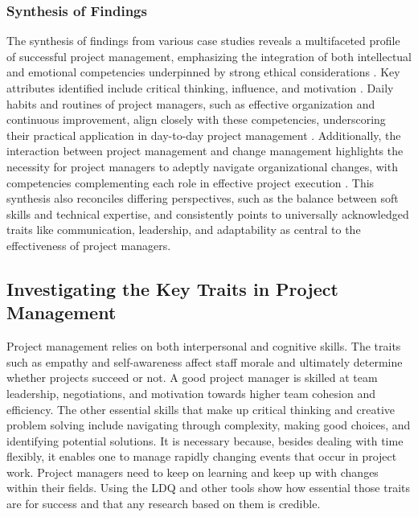 \documentclass{article}
\begin{document}
\subsubsection{Synthesis of Findings}

The synthesis of findings from various case studies reveals a multifaceted profile of successful project management, emphasizing the integration of both intellectual and emotional competencies underpinned by strong ethical considerations \cite{bredillet2015good}. Key attributes identified include critical thinking, influence, and motivation \cite{muller2010leadership}. Daily habits and routines of project managers, such as effective organization and continuous improvement, align closely with these competencies, underscoring their practical application in day-to-day project management \cite{sigurdhssonpatterns}. Additionally, the interaction between project management and change management highlights the necessity for project managers to adeptly navigate organizational changes, with competencies complementing each role in effective project execution \cite{pollack2016project}. This synthesis also reconciles differing perspectives, such as the balance between soft skills and technical expertise, and consistently points to universally acknowledged traits like communication, leadership, and adaptability as central to the effectiveness of project managers.


\subsection{Investigating the Key Traits in Project Management}
Project management relies on both interpersonal and cognitive skills. The traits such as empathy and self-awareness affect staff morale and ultimately determine whether projects succeed or not. A good project manager is skilled at team leadership, negotiations, and motivation towards higher team cohesion and efficiency. The other essential skills that make up critical thinking and creative problem solving include navigating through complexity, making good choices, and identifying potential solutions. It is necessary because, besides dealing with time flexibly, it enables one to manage rapidly changing events that occur in project work. Project managers need to keep on learning and keep up with changes within their fields. Using the LDQ and other tools show how essential those traits are for success and that any research based on them is credible.\cite{muller2010leadership}
\end{document}
